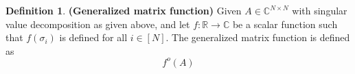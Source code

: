 \documentclass[12pt, oneside]{book}
\theoremstyle{definition}
\newtheorem{definition}{Definition}[section]
\theoremstyle{definition}
\theoremstyle{remark}
\begin{document}
\begin{definition}
    \textbf{(Generalized matrix function)} Given $A \in \mathbb{C}^{N \times N}$ with singular value decomposition as given above, and let $f: \mathbb{R} \rightarrow \mathbb{C}$ be a scalar function such that $f(\sigma_i)$ is defined for all $i \in [N]$. The generalized matrix function is defined as
    \[
    f^{o}(A)
    \]
\end{definition}
\backmatter  %
    
    
\end{document}
